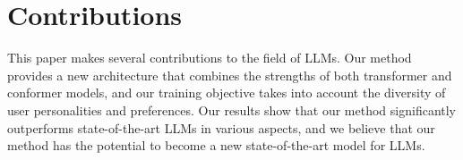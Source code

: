 \documentclass{article}
\begin{document}
\section{Contributions}

This paper makes several contributions to the field of LLMs. Our method provides a new architecture that combines the strengths of both transformer and conformer models, and our training objective takes into account the diversity of user personalities and preferences. Our results show that our method significantly outperforms state-of-the-art LLMs in various aspects, and we believe that our method has the potential to become a new state-of-the-art model for LLMs.
\end{document}
